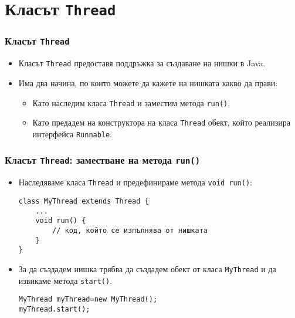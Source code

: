 \documentclass[ignorenonframetext, hyperref=unicode,compress]{beamer}
\begin{document}
\section{Класът \lstinline{Thread}}
\begin{frame}[containsverbatim]
\frametitle{Класът \lstinline{Thread}}
\begin{itemize}
\item Класът \lstinline{Thread} предоставя поддръжка за създаване на
нишки в Java.
\item Има два начина, по които можете да кажете на нишката какво да прави:
\begin{itemize}
  \item Като наследим класа \lstinline{Thread} и заместим метода
  \lstinline{run()}.
  \item Като предадем на конструктора на класа \lstinline{Thread} обект, който
  реализира интерфейса \lstinline{Runnable}.
\end{itemize}
\end{itemize}
\end{frame}


\begin{frame}[containsverbatim]
\frametitle{Класът \lstinline{Thread}: заместване на метода \lstinline{run()}}
\begin{itemize}
\item Наследяваме класа \lstinline{Thread} и предефинираме метода
\lstinline{void run()}:
\begin{lstlisting}
class MyThread extends Thread {
	...
	void run() {
		// код, който се изпълнява от нишката
	}
}
\end{lstlisting}

\item За да създадем нишка трябва да създадем обект от класа
\lstinline{MyThread} и да извикаме метода \lstinline{start()}.
\begin{lstlisting}
MyThread myThread=new MyThread();
myThread.start();
\end{lstlisting}
\end{itemize}
\end{frame}
\end{document}
